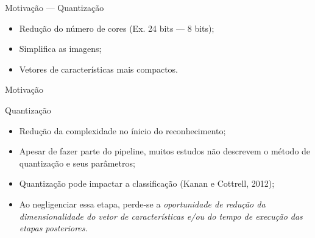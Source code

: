 \documentclass[10pt]{beamer}
\begin{document}
\begin{frame}{Motivação --- Quantização}
  \setlength\leftmargini{1em}
    \begin{figure}[htbp]
    \begin{center}
      \hspace{1.5cm}
    \end{center}
  \end{figure}
  \begin{itemize}
    \item Redução do número de cores (Ex. 24 bits --- 8 bits);
    \item Simplifica as imagens;
    \item Vetores de características mais compactos.
  \end{itemize}
\end{frame}
\begin{frame}{Motivação}
  \setlength\leftmargini{1em}
  \begin{block}{Quantização}
  \begin{itemize}
        \item Redução da complexidade no ínicio do reconhecimento;
    \item Apesar de fazer parte do pipeline, muitos estudos não descrevem o método de quantização e seus parâmetros;
    \item Quantização pode impactar a classificação (Kanan e Cottrell, 2012);
    \item Ao negligenciar essa etapa, perde-se a \textit{oportunidade de redução da dimensionalidade do vetor de características e/ou do tempo de execução das etapas posteriores.}
  \end{itemize}
  \end{block}
\end{frame}
\end{document}
